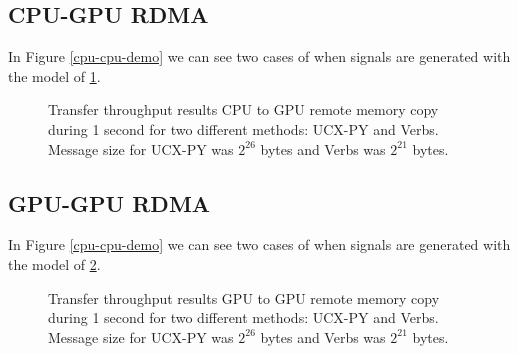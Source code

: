 \documentclass[a4paper,onecolumn]{article}
\begin{document}
\subsection{CPU-GPU RDMA}
In Figure \ref{cpu-cpu-demo} we can see two cases of when signals are generated with the model of \ref{cpu-gpu-demo}.

\begin{figure}[H]
\begin{center}
\caption{Transfer throughput results CPU to GPU remote memory copy during 1 second for two different methods: UCX-PY and Verbs. Message size for UCX-PY was $2^{26}$ bytes and Verbs was $2^{21}$ bytes.}
\label{cpu-gpu-demo}
\end{center}
\end{figure}

\subsection{GPU-GPU RDMA}
In Figure \ref{cpu-cpu-demo} we can see two cases of when signals are generated with the model of \ref{gpu-gpu-demo}.


\begin{figure}[H]
\begin{center}
\caption{Transfer throughput results GPU to GPU remote memory copy during 1 second for two different methods: UCX-PY and Verbs. Message size for UCX-PY was $2^{26}$ bytes and Verbs was $2^{21}$ bytes.}
\label{gpu-gpu-demo}
\end{center}
\end{figure}
\end{document}
